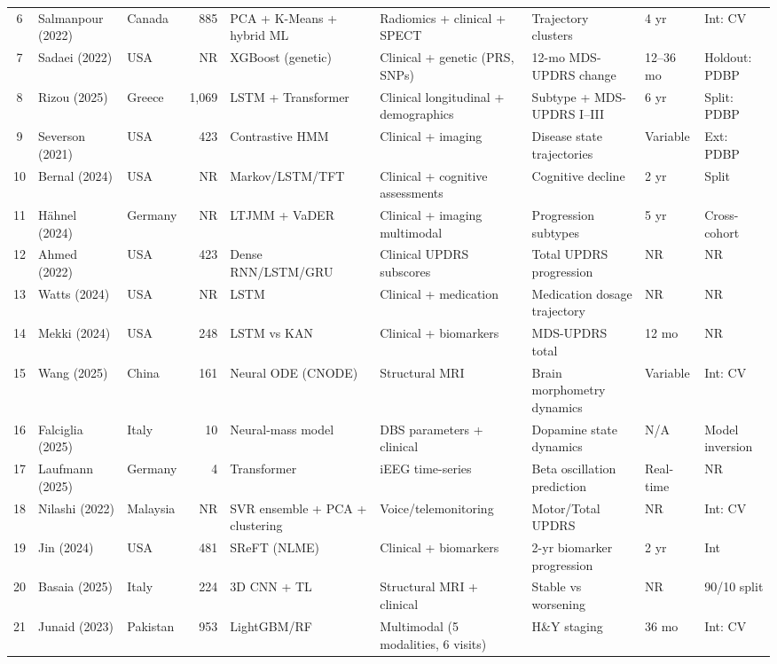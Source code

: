 \documentclass[11pt,a4paper]{article}
\begin{document}
\begin{landscape}
\begin{small}
\begin{longtable}{@{}clp{1.8cm}rp{2.2cm}p{2.5cm}p{2.8cm}p{1.5cm}p{1.8cm}@{}}
6  & Salmanpour (2022) & Canada  & 885   & PCA + K-Means + hybrid ML & Radiomics + clinical + SPECT & Trajectory clusters & 4 yr & Int: CV \\
7  & Sadaei (2022)     & USA     & NR    & XGBoost (genetic) & Clinical + genetic (PRS, SNPs) & 12-mo MDS-UPDRS change & 12--36 mo & Holdout: PDBP \\
8  & Rizou (2025)      & Greece  & 1,069 & LSTM + Transformer & Clinical longitudinal + demographics & Subtype + MDS-UPDRS I--III & 6 yr & Split: PDBP \\
9  & Severson (2021)   & USA     & 423   & Contrastive HMM & Clinical + imaging & Disease state trajectories & Variable & Ext: PDBP \\
10 & Bernal (2024)     & USA     & NR    & Markov/LSTM/TFT & Clinical + cognitive assessments & Cognitive decline & 2 yr & Split \\
11 & H\"ahnel (2024)   & Germany & NR    & LTJMM + VaDER & Clinical + imaging multimodal & Progression subtypes & 5 yr & Cross-cohort \\
12 & Ahmed (2022)      & USA     & 423   & Dense RNN/LSTM/GRU & Clinical UPDRS subscores & Total UPDRS progression & NR & NR \\
13 & Watts (2024)      & USA     & NR    & LSTM & Clinical + medication & Medication dosage trajectory & NR & NR \\
14 & Mekki (2024)      & USA     & 248   & LSTM vs KAN & Clinical + biomarkers & MDS-UPDRS total & 12 mo & NR \\
15 & Wang (2025)       & China   & 161   & Neural ODE (CNODE) & Structural MRI & Brain morphometry dynamics & Variable & Int: CV \\
16 & Falciglia (2025)  & Italy   & 10    & Neural-mass model & DBS parameters + clinical & Dopamine state dynamics & N/A & Model inversion \\
17 & Laufmann (2025)   & Germany & 4     & Transformer & iEEG time-series & Beta oscillation prediction & Real-time & NR \\
18 & Nilashi (2022)    & Malaysia & NR   & SVR ensemble + PCA + clustering & Voice/telemonitoring & Motor/Total UPDRS & NR & Int: CV \\
19 & Jin (2024)        & USA     & 481   & SReFT (NLME) & Clinical + biomarkers & 2-yr biomarker progression & 2 yr & Int \\
20 & Basaia (2025)     & Italy   & 224   & 3D CNN + TL & Structural MRI + clinical & Stable vs worsening & NR & 90/10 split \\
21 & Junaid (2023)     & Pakistan & 953  & LightGBM/RF & Multimodal (5 modalities, 6 visits) & H\&Y staging & 36 mo & Int: CV \\

\end{longtable}
\end{small}
\end{landscape}
\end{document}
